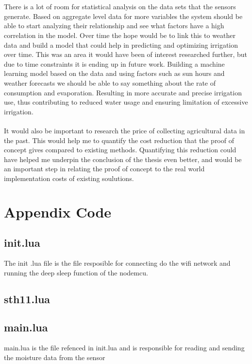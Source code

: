 \documentclass[]{uiophd}
\begin{document}
\\\\
There is a lot of room for statistical analysis on the data sets that the sensors generate. Based on aggregate level data for more variables the system should be able to start analyzing their relationship and see what factors have a high correlation in the model. Over time the hope would be to link this to weather data and build a model that could help in predicting and optimizing irrigation over time. This was an area it would have been of interest researched further, but due to time constraints it is ending up in future work. Building a machine learning model based on the data and using factors such as sun hours and weather forecasts we should be able to say something about the rate of consumption and evaporation. Resulting in more accurate and precise irrigation use, thus contributing to reduced water usage and ensuring limitation of excessive irrigation.
\\\\
It would also be important to research the price of collecting agricultural data in the past. This would help me to quantify the cost reduction that the proof of concept gives compared to existing methods. Quantifying this reduction could have helped me underpin the conclusion of the thesis even better, and would be an important step in relating the proof of concept to the real world implementation costs of existing soulutions.

\printbibliography

\chapter{Appendix Code}
\linespread{1}

\section{init.lua}
The init .lua file is the file resposible for connecting do the wifi network and running the deep sleep function of the nodemcu.


\section{sth11.lua}


\section{main.lua}
main.lua is the file refenced in init.lua and is responsible for reading and sending the moisture data from the sensor

\end{document}
